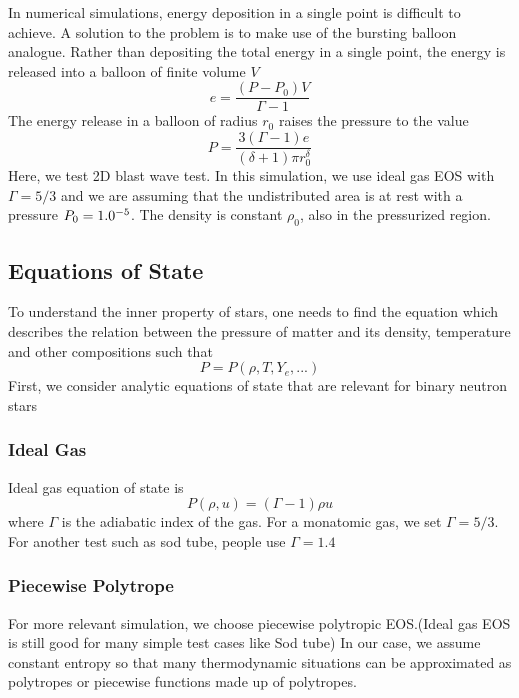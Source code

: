 \documentclass{article}
\begin{document}
In numerical simulations, energy deposition in a single point is difficult to achieve. A solution to the problem is to make use of the bursting balloon analogue. Rather than depositing the total energy in a single point, the energy is released into a balloon of finite volume $V$
\begin{equation}
e = \frac{(P-P_0)V}{\Gamma -1}
\end{equation}
The energy release in a balloon of radius $r_0$ raises the pressure to the value
\begin{equation}
P = \frac{3(\Gamma-1)e}{(\delta+1) \pi r_0^{\delta}}
\end{equation}
Here, we test 2D blast wave test. In this simulation, we use ideal gas EOS with $\Gamma = 5/3$ and we are assuming that the undistributed area is at rest with a pressure $P_0 = 1.0 \time 10^{-5}$. The density is constant $\rho_0$, also in the pressurized region.


\subsection{Equations of State}
\label{sec:eos}
To understand the inner property of stars, one needs to find the equation which describes the relation between the pressure of matter and its density, temperature and other compositions such that
\begin{equation}
P = P(\rho, T, Y_e, ...)
\end{equation}
First, we consider analytic equations of state that are relevant for binary neutron stars
\subsubsection{Ideal Gas}
Ideal gas equation of state is
\begin{equation}
P(\rho,u) = (\Gamma - 1) \rho u
\end{equation}
where $\Gamma$ is the adiabatic index of the gas. For a monatomic gas, we set $\Gamma = 5/3$. For another test such as sod tube, people use $\Gamma = 1.4$
\subsubsection{Piecewise Polytrope}
For more relevant simulation, we choose piecewise polytropic EOS.(Ideal gas EOS is still good for many simple test cases like Sod tube) In our case, we assume constant entropy so that many thermodynamic situations can be approximated as polytropes or piecewise functions made up of polytropes.
\end{document}

